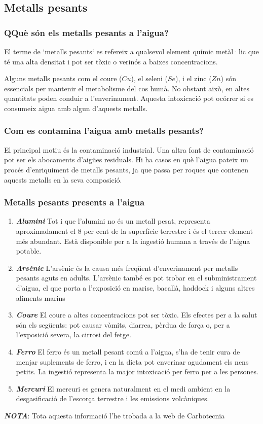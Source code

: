 \subsection{Metalls pesants} \label{subsec:metallspesats}
\subsubsection{QQuè són els metalls pesants a l’aigua?}
El terme de `metalls pesants` es refereix a qualsevol element químic metàl·lic que té una alta densitat i pot ser tòxic o verinós a baixes concentracions.

Alguns metalls pesants com el coure ($Cu$), el seleni ($Se$), i el zinc ($Zn$) són essencials per mantenir el metabolisme del cos humà. No obstant això, en altes quantitats poden conduir a l'enverinament. Aquesta intoxicació pot ocórrer si es consumeix aigua amb algun d’aquests metalls.
\subsubsection{Com es contamina l’aigua amb metalls pesants?}
El principal motiu és la contaminació industrial. Una altra font de contaminació pot ser els abocaments d'aigües residuals. Hi ha casos en què l’aigua pateix un procés d’enriquiment de metalls pesants, ja que passa per roques que contenen aquests metalls en la seva composició.
\subsubsection{Metalls pesants presents a l'aigua}
\begin{enumerate}
 \item \textit{\textbf{Alumini}}
 Tot i que l'alumini no és un metall pesat, representa aproximadament el 8 per cent de la superfície terrestre i és el tercer element més abundant. Està disponible per a la ingestió humana a través de l'aigua potable.
 \item \textit{\textbf{Arsènic}}
 L'arsènic és la causa més freqüent d'enverinament per metalls pesants aguts en adults. L'arsènic també es pot trobar en el subministrament d'aigua, el que porta a l'exposició en marisc, bacallà, haddock i alguns altres aliments marins
 \item \textit{\textbf{Coure}}
 El coure a altes concentracions pot ser tòxic. Els efectes per a la salut són els següents: pot causar vòmits, diarrea, pèrdua de força o, per a l'exposició severa, la cirrosi del fetge.
 \item \textit{\textbf{Ferro}}
 El ferro és un metall pesant comú a l'aigua, s'ha de tenir cura de menjar suplements de ferro, i en la dieta pot enverinar agudament els nens petits. La ingestió representa la major intoxicació per ferro per a les persones.
 \item \textit{\textbf{Mercuri}}
 El mercuri es genera naturalment en el medi ambient en la desgasificació de l'escorça terrestre i les emissions volcàniques.
\end{enumerate}
\textit{\textbf{NOTA}}: Tota aquesta informació l'he trobada a la web de Carbotecnia \cite{Carbotecnia}
